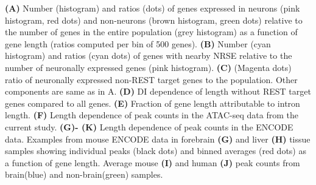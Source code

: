\textbf{(A)} Number (histogram) and ratios (dots) of genes expressed in neurons (pink histogram, red dots) and non-neurons (brown histogram, green dots) relative to the number of genes in the entire population (grey histogram) as a function of gene length (ratios computed per bin of 500 genes). 
\textbf{(B)} Number (cyan histogram) and ratios (cyan dots) of genes with nearby NRSE relative to the number of neuronally expressed genes (pink histogram). 
\textbf{(C)} (Magenta dots) ratio of neuronally expressed non-REST target genes to the population. Other components are same as in A.
\textbf{(D)} DI dependence of length without REST target genes compared to all genes.
\textbf{(E)} Fraction of gene length attributable to intron length.
\textbf{(F)} Length dependence of peak counts in the ATAC-seq data from the current study.
\textbf{(G)- (K)} Length dependence of peak counts in the ENCODE data. Examples from mouse ENCODE data in forebrain \textbf{(G)} and liver \textbf{(H)} tissue samples showing individual peaks (black dots) and binned averages (red dots) as a function of gene length. Average mouse \textbf{(I)} and human \textbf{(J)} peak counts from brain(blue) and non-brain(green) samples.




